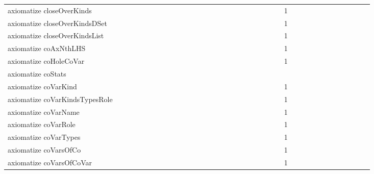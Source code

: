 {\begin{tabular}{l|rrr|rrr|rrr}
axiomatize closeOverKinds &  &  &  &  &  &  &  &  &  &  &  &  &  &  &  &  &  &  &  &  &  &  &  & 1 &  &  &  &  &  &  &  &  &  &  &  & \\
axiomatize closeOverKindsDSet &  &  &  &  &  &  &  &  &  &  &  &  &  &  &  &  &  &  &  &  &  &  &  & 1 &  &  &  &  &  &  &  &  &  &  &  & \\
axiomatize closeOverKindsList &  &  &  &  &  &  &  &  &  &  &  &  &  &  &  &  &  &  &  &  &  &  &  & 1 &  &  &  &  &  &  &  &  &  &  &  & \\
axiomatize coAxNthLHS &  &  &  &  &  &  &  &  &  &  &  &  &  &  &  &  &  &  &  &  &  &  &  & 1 &  &  &  &  &  &  &  &  &  &  &  & \\
axiomatize coHoleCoVar &  &  &  &  &  &  &  &  &  &  &  &  &  &  &  &  &  &  &  &  &  &  &  & 1 &  &  &  &  &  &  &  &  &  &  &  & \\
axiomatize coStats &  &  &  &  &  &  &  &  &  &  &  &  &  &  &  &  &  &  &  &  &  &  &  &  &  &  &  &  &  &  &  &  &  &  &  & \\
axiomatize coVarKind &  &  &  &  &  &  &  &  &  &  &  &  &  &  &  &  &  &  &  &  &  &  &  & 1 &  &  &  &  &  &  &  &  &  &  &  & \\
axiomatize coVarKindsTypesRole &  &  &  &  &  &  &  &  &  &  &  &  &  &  &  &  &  &  &  &  &  &  &  & 1 &  &  &  &  &  &  &  &  &  &  &  & \\
axiomatize coVarName &  &  &  &  &  &  &  &  &  &  &  &  &  &  &  &  &  &  &  &  &  &  &  & 1 &  &  &  &  &  &  &  &  &  &  &  & \\
axiomatize coVarRole &  &  &  &  &  &  &  &  &  &  &  &  &  &  &  &  &  &  &  &  &  &  &  & 1 &  &  &  &  &  &  &  &  &  &  &  & \\
axiomatize coVarTypes &  &  &  &  &  &  &  &  &  &  &  &  &  &  &  &  &  &  &  &  &  &  &  & 1 &  &  &  &  &  &  &  &  &  &  &  & \\
axiomatize coVarsOfCo &  &  &  &  &  &  &  &  &  &  &  &  &  &  &  &  &  &  &  &  &  &  &  & 1 &  &  &  &  &  &  &  &  &  &  &  & \\
axiomatize coVarsOfCoVar &  &  &  &  &  &  &  &  &  &  &  &  &  &  &  &  &  &  &  &  &  &  &  & 1 &  &  &  &  &  &  &  &  &  &  &  & \\

\end{tabular}}

